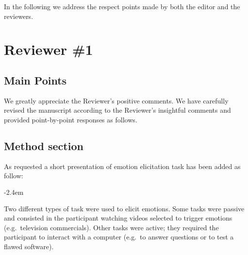 \documentclass[]{article}
\renewenvironment{quote}{\begin{fquote}\advance\leftmargini -2.4em\begin{oldquote}}{\end{oldquote}\end{fquote}}
\newenvironment{fquote}
  {\def\FrameCommand{
	\fboxsep=0.6em %
	\fcolorbox{black}{white}}%
    \MakeFramed {\advance\hsize-2\width \FrameRestore}
    \begin{minipage}{\linewidth}
  }
  {\end{minipage}\endMakeFramed}
\begin{document}
In the following we address the respect points made by both the editor and the reviewers.

\hypertarget{reviewer-1}{%
\section{Reviewer \#1}\label{reviewer-1}}

\hypertarget{main-points}{%
\subsection{Main Points}\label{main-points}}


We greatly appreciate the Reviewer's positive comments. We have carefully revised the manuscript according to the Reviewer's insightful comments and provided point-by-point responses as follows.

\hypertarget{method-section}{%
\subsection{Method section}\label{method-section}}


As requested a short presentation of emotion elicitation task has been added as follow:

\begin{quote}
Two different types of task were used to elicit emotions. Some tasks were passive and consisted in the participant watching videos selected to trigger emotions (e.g.~television commercials). Other tasks were active; they required the participant to interact with a computer (e.g.~to answer questions or to test a flawed software).
\end{quote}

\end{document}
